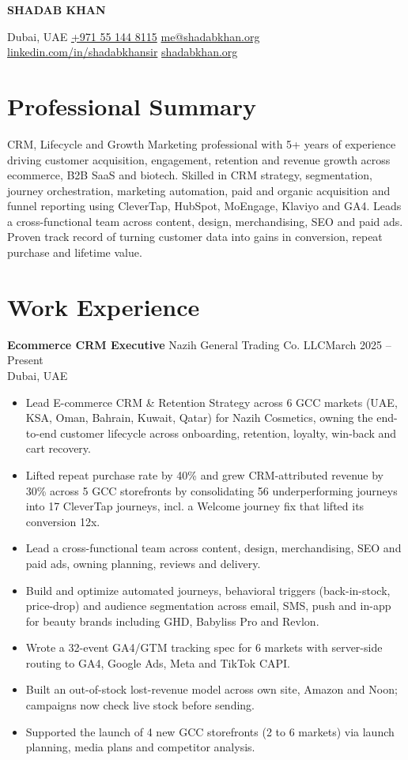 \documentclass[10pt,a4paper]{article}
\newcommand{\headergap}{-8pt}
\newcommand{\resumename}[1]{\begin{center}\fontsize{16pt}{17pt}\selectfont\bfseries\color{heading} #1\end{center}\vspace{\headergap}}
\newcommand{\contactline}[1]{\begin{center}\footnotesize\color{subtle} #1\end{center}}
\newcommand{\jobheading}[4]{\vspace{3pt}\noindent\textbf{#2} \textbar{} #1\hfill{\footnotesize #4}\\[0.5pt]{\footnotesize #3}\par\vspace{1pt}}
\newcommand{\resumeliststart}{\begin{itemize}[leftmargin=*, itemsep=1pt, topsep=1pt, partopsep=0pt, parsep=0pt, after=\vspace{3pt}]}
\newcommand{\resumelistend}{\end{itemize}\vspace{1pt}}
\begin{document}
\color{text}

\resumename{SHADAB KHAN}
\contactline{Dubai, UAE \textbar{} \href{tel:+971551448115}{+971 55 144 8115} \textbar{} \href{mailto:me@shadabkhan.org}{me@shadabkhan.org} \textbar{} \href{https://linkedin.com/in/shadabkhansir}{linkedin.com/in/shadabkhansir} \textbar{} \href{https://shadabkhan.org}{shadabkhan.org}}

\section*{Professional Summary}
CRM, Lifecycle and Growth Marketing professional with 5+ years of experience driving customer acquisition, engagement, retention and revenue growth across ecommerce, B2B SaaS and biotech. Skilled in CRM strategy, segmentation, journey orchestration, marketing automation, paid and organic acquisition and funnel reporting using CleverTap, HubSpot, MoEngage, Klaviyo and GA4. Leads a cross-functional team across content, design, merchandising, SEO and paid ads. Proven track record of turning customer data into gains in conversion, repeat purchase and lifetime value.

\section*{Work Experience}

\jobheading{Nazih General Trading Co. LLC}{Ecommerce CRM Executive}{Dubai, UAE}{March 2025 -- Present}
\resumeliststart
  \item Lead E-commerce CRM \& Retention Strategy across 6 GCC markets (UAE, KSA, Oman, Bahrain, Kuwait, Qatar) for Nazih Cosmetics, owning the end-to-end customer lifecycle across onboarding, retention, loyalty, win-back and cart recovery.
  \item Lifted repeat purchase rate by 40\% and grew CRM-attributed revenue by 30\% across 5 GCC storefronts by consolidating 56 underperforming journeys into 17 CleverTap journeys, incl. a Welcome journey fix that lifted its conversion 12x.
  \item Lead a cross-functional team across content, design, merchandising, SEO and paid ads, owning planning, reviews and delivery.
  \item Build and optimize automated journeys, behavioral triggers (back-in-stock, price-drop) and audience segmentation across email, SMS, push and in-app for beauty brands including GHD, Babyliss Pro and Revlon.
  \item Wrote a 32-event GA4/GTM tracking spec for 6 markets with server-side routing to GA4, Google Ads, Meta and TikTok CAPI.
  \item Built an out-of-stock lost-revenue model across own site, Amazon and Noon; campaigns now check live stock before sending.
  \item Supported the launch of 4 new GCC storefronts (2 to 6 markets) via launch planning, media plans and competitor analysis.
\resumelistend
\end{document}
